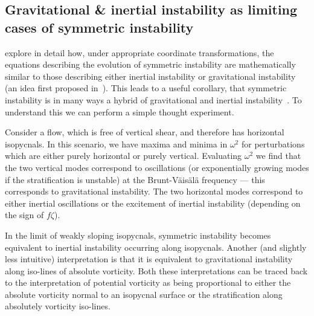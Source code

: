     \subsection{Gravitational \& inertial instability as limiting cases of symmetric instability}
    \label{sec:Xu}
    \citet{Xu1985} explore in detail how, under appropriate coordinate transformations, the equations describing the evolution of symmetric instability are mathematically similar to those describing either inertial instability or gravitational instability (an idea first proposed in~\citet{Hoskins1974}). This leads to a useful corollary, that symmetric instability is in many ways a hybrid of gravitational and inertial instability~\citep[e.g.][]{Haine1998}. To understand this we can perform a simple thought experiment.

    Consider a flow, which is free of vertical shear, and therefore has horizontal isopycnals. In this scenario, we have maxima and minima in $\omega^2$ for perturbations which are either purely horizontal or purely vertical. Evaluating $\omega^2$ we find that the two vertical modes correspond to oscillations (or exponentially growing modes if the stratification is unstable) at the Brunt-V\"ais\"al\"a frequency --- this corresponds to gravitational instability. The two horizontal modes correspond to either inertial oscillations or the excitement of inertial instability (depending on the sign of $f \zeta$).

    In the limit of weakly sloping isopycnals, symmetric instability becomes equivalent to inertial instability occurring along isopycnals. Another (and slightly less intuitive) interpretation is that it is equivalent to gravitational instability along iso-lines of absolute vorticity. Both these interpretations can be traced back to the interpretation of potential vorticity as being proportional to either the absolute vorticity normal to an isopycnal surface or the stratification along absolutely vorticity iso-lines.
    
